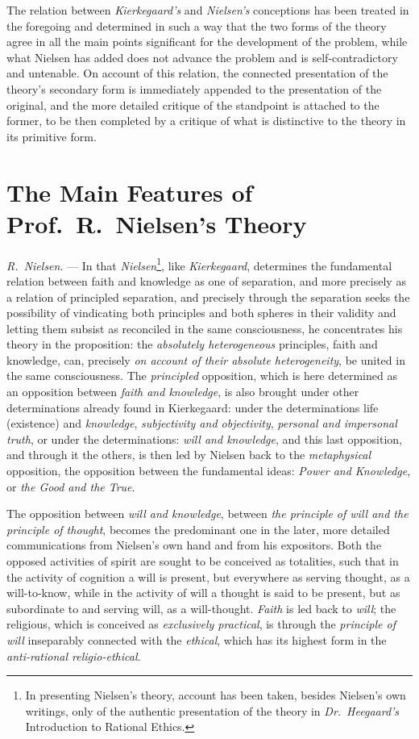 \documentclass[12pt,a4paper]{book}
\begin{document}
The relation between \emph{Kierkegaard's} and \emph{Nielsen's} conceptions has been
treated in the foregoing and determined in such a way that the two forms
of the theory agree in all the main points significant for the
development of the problem, while what Nielsen has added does not
advance the problem and is self-contradictory and untenable. On account
of this relation, the connected presentation of the theory's secondary
form is immediately appended to the presentation of the original, and
the more detailed critique of the standpoint is attached to the former,
to be then completed by a critique of what is distinctive to the theory
in its primitive form.

\section{The Main Features of Prof.\ R.\ Nielsen's Theory}
\label{sec:nielsen-theory}

\emph{R.\ Nielsen}. --- In that \emph{Nielsen}\footnote{In presenting Nielsen's theory, account has been taken, besides Nielsen's own
writings, only of the authentic presentation of the theory in \textit{Dr.}\ \emph{Heegaard's} Introduction to Rational Ethics.}, like \emph{Kierkegaard}, determines the fundamental relation
between faith and knowledge as one of separation, and more precisely as
a relation of principled separation, and precisely through the
separation seeks the possibility of vindicating both principles and both
spheres in their validity and letting them subsist as reconciled in the
same consciousness, he concentrates his theory in the proposition: the
\emph{absolutely heterogeneous} principles, faith and knowledge, can, precisely
\emph{on account of their absolute heterogeneity}, be united in the same
consciousness. The \emph{principled} opposition, which is here determined as an
opposition between \emph{faith and knowledge}, is also brought under other
determinations already found in Kierkegaard: under the determinations
life (existence) and \emph{knowledge}, \emph{subjectivity and objectivity}, \emph{personal
and impersonal truth}, or under the determinations: \emph{will and knowledge}, and
this last opposition, and through it the others, is then led by
Nielsen back to the \emph{metaphysical} opposition, the opposition between the
fundamental ideas: \emph{Power and Knowledge}, or \emph{the Good and the True}.

The opposition between \emph{will and knowledge}, between \emph{the principle of will
and the principle of thought}, becomes the predominant one in the later,
more detailed communications from Nielsen's own hand and from his
expositors. Both the opposed activities of spirit are sought to be
conceived as totalities, such that in the activity of cognition a will
is present, but everywhere as serving thought, as a will-to-know, while
in the activity of will a thought is said to be present, but as
subordinate to and serving will, as a will-thought. \emph{Faith} is led back to
\emph{will}; the religious, which is conceived as \emph{exclusively practical}, is
through the \emph{principle of will} inseparably connected with the \emph{ethical},
which has its highest form in the \emph{anti-rational religio-ethical}.
\end{document}
